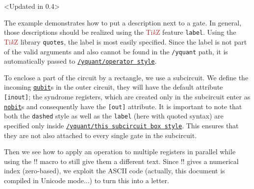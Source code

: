 \documentclass{scrartcl}
\makeatletter
\newenvironment{codeexample*}{%
   \VerbatimEnvironment%
   \let\FVB@VerbatimOut\minted@FVB@VerbatimOut
   \let\FVE@VerbatimOut\minted@FVE@VerbatimOut
   \minted@configlang{tex}%
   \minted@fvset
   \begin{VerbatimOut}[codes={\catcode`\^^I=12},firstline,lastline]{\minted@jobname.pyg}%
}{
   \end{VerbatimOut}%
   \minted@langlinenoson%
   \begin{adjustbox}{center}
       \minted@jobname.pyg %
   \end{adjustbox}\nopagebreak
   \expandafter\minted@pygmentize\expandafter{\minted@lang}%
   \minted@langlinenosoff%
   \par%
}
\def\TikZ{\textcolor{brown}{Ti\textit kZ}}
\def\gate#1{\hyperref[gate:#1]{\texttt{#1}}}
\def\style#1{\hyperref[style:#1]{\texttt{#1}}}
\makeatother
\begin{document}
            \begin{example}<Updated in 0.4>
               \begin{codeexample*}
               \end{codeexample*}
               The example demonstrates how to put a description next to a gate.
               In general, those descriptions should be realized using the \TikZ{} feature \texttt{label}.
               Using the \TikZ{} library \texttt{quotes}, the label is most easily specified.
               Since the label is not part of the valid arguments and also cannot be found in the \texttt{/yquant} path, it is automatically passed to \style{/yquant/operator style}.

               To enclose a part of the circuit by a rectangle, we use a subcircuit.
               We define the incoming \gate{qubit}s in the outer circuit, they will have the default attribute \texttt{[inout]}; the syndrome registers, which are created only in the subcircuit enter as \gate{nobit}s and consequently have the \texttt{[out]} attribute.
               It is important to note that both the \texttt{dashed} style as well as the \texttt{label} (here with quoted syntax) are specified only inside \style{/yquant/this subcircuit box style}.
               This ensures that they are not also attached to every single gate in the subcircuit.

               Then we see how to apply an operation to multiple registers in parallel while using the \tex!\idx! macro to still give them a different text.
               Since \tex!\idx! gives a numerical index (zero\hyp based), we exploit the ASCII code (actually, this document is compiled in Unicode mode...) to turn this into a letter.


\end{example}
\end{document}
